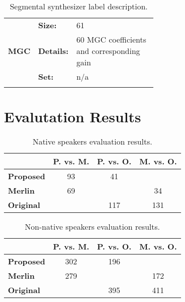 \begin{longtable}[c]{llp{0.6\linewidth}}
\multirow{3}{0.18\linewidth}{{\bf \ac{MGC}}}
          & {\bf Size:} 
                                & 61 \\
          & {\bf Details:} 
                                & 60 \ac{MGC} coefficients and corresponding gain\\
          & {\bf Set:} 
                                &  n/a\\

\bottomrule
\caption{Segmental synthesizer label description.}
\label{seg-labels-table}
\end{longtable}
\clearpage



\chapter{Evalutation Results}\label{sec:appendix-d}


\begin{table}[h!]
  \centering
  \begin{tabular}{lccc}
    \toprule

     & {\bf P. vs. M.} & {\bf P. vs. O.} & {\bf M. vs. O.} \\
     \midrule
     
    {\bf Proposed} & 93 & 41 &  \\  

    {\bf Merlin} & 69 &  & 34 \\     
    
    {\bf Original} & & 117 & 131 \\  
    \bottomrule
    \end{tabular}
  \caption{Native speakers evaluation results.}
  \label{tab:native-eval-result}
\end{table}


\begin{table}[h!]
  \centering
  \begin{tabular}{lccc}
    \toprule

     & {\bf P. vs. M.} & {\bf P. vs. O.} & {\bf M. vs. O.} \\
     \midrule
     
    {\bf Proposed} & 302 & 196 &  \\  

    {\bf Merlin} & 279 &  & 172 \\     
    
    {\bf Original} & & 395 & 411 \\  
    \bottomrule
    
    \end{tabular}
  \caption{Non-native speakers evaluation results.}
  \label{tab:non-native-eval-result}
\end{table}

